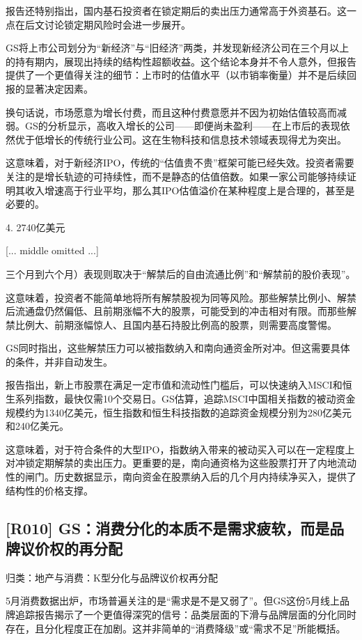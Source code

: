 \documentclass[11pt]{ctexart}
\begin{document}
报告还特别指出，国内基石投资者在锁定期后的卖出压力通常高于外资基石。这一点在后文讨论锁定期风险时会进一步展开。

GS将上市公司划分为“新经济”与“旧经济”两类，并发现新经济公司在三个月以上的持有期内，展现出持续的结构性超额收益。这个结论本身并不令人意外，但报告提供了一个更值得关注的细节：上市时的估值水平（以市销率衡量）并不是后续回报的显著决定因素。

换句话说，市场愿意为增长付费，而且这种付费意愿并不因为初始估值较高而减弱。GS的分析显示，高收入增长的公司——即便尚未盈利——在上市后的表现依然优于低增长的传统行业公司。这在生物科技和信息技术领域表现得尤为突出。

这意味着，对于新经济IPO，传统的“估值贵不贵”框架可能已经失效。投资者需要关注的是增长轨迹的可持续性，而不是静态的估值倍数。如果一家公司能够持续证明其收入增速高于行业平均，那么其IPO估值溢价在某种程度上是合理的，甚至是必要的。

4. 2740亿美元

[... middle omitted ...]

三个月到六个月）表现则取决于“解禁后的自由流通比例”和“解禁前的股价表现”。

这意味着，投资者不能简单地将所有解禁股视为同等风险。那些解禁比例小、解禁后流通盘仍然偏低、且前期涨幅不大的股票，可能受到的冲击相对有限。而那些解禁比例大、前期涨幅惊人、且国内基石持股比例高的股票，则需要高度警惕。

GS同时指出，这些解禁压力可以被指数纳入和南向通资金所对冲。但这需要具体的条件，并非自动发生。

报告指出，新上市股票在满足一定市值和流动性门槛后，可以快速纳入MSCI和恒生系列指数，最快仅需10个交易日。GS估算，追踪MSCI中国相关指数的被动资金规模约为1340亿美元，恒生指数和恒生科技指数的追踪资金规模分别为280亿美元和240亿美元。

这意味着，对于符合条件的大型IPO，指数纳入带来的被动买入可以在一定程度上对冲锁定期解禁的卖出压力。更重要的是，南向通资格为这些股票打开了内地流动性的闸门。历史数据显示，南向资金在股票纳入后的几个月内持续净买入，提供了结构性的价格支撑。

\subsection{[R010] GS：消费分化的本质不是需求疲软，而是品牌议价权的再分配}
{\small\color{refgray}归类：地产与消费：K型分化与品牌议价权再分配}

5月消费数据出炉，市场普遍关注的是“需求是不是又弱了”。但GS这份5月线上品牌追踪报告揭示了一个更值得深究的信号：品类层面的下滑与品牌层面的分化同时存在，且分化程度正在加剧。这并非简单的“消费降级”或“需求不足”所能概括。
\end{document}
